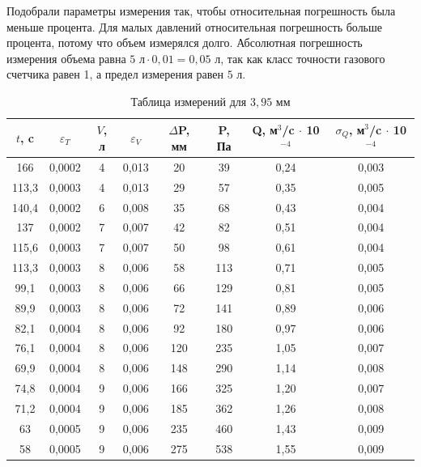 \documentclass[a4paper, 12pt]{article}
\begin{document}
Подобрали параметры измерения так, чтобы относительная погрешность была меньше процента. Для малых давлений относительная погрешность больше процента, потому что объем измерялся долго.
Абсолютная погрешность измерения объема равна $5 \text{ л} \cdot 0,01 = 0,05 \text{ л}$, так как класс точности газового счетчика равен 1, а предел измерения равен $5$ л.

\begin{table}[!ht]
    \centering
    \begin{tabular}{|c|c|c|c|c|c|c|c|}
    \hline
        $t$, c & $\varepsilon_T$ & $V$, л & $\varepsilon_V$ & $\Delta$P, мм & P, Па & Q, м$^3$/c $\cdot$ 10$^{-4}$ & $\sigma_Q$, м$^3$/c $\cdot$ 10$^{-4}$ \\ \hline
        166 & 0,0002 & 4 & 0,013 & 20 & 39 & 0,24 & 0,003 \\ \hline
        113,3 & 0,0003 & 4 & 0,013 & 29 & 57 & 0,35 & 0,005 \\ \hline
        140,4 & 0,0002 & 6 & 0,008 & 35 & 68 & 0,43 & 0,004 \\ \hline
        137 & 0,0002 & 7 & 0,007 & 42 & 82 & 0,51 & 0,004 \\ \hline
        115,6 & 0,0003 & 7 & 0,007 & 50 & 98 & 0,61 & 0,004 \\ \hline
        113,3 & 0,0003 & 8 & 0,006 & 58 & 113 & 0,71 & 0,005 \\ \hline
        99,1 & 0,0003 & 8 & 0,006 & 66 & 129 & 0,81 & 0,005 \\ \hline
        89,9 & 0,0003 & 8 & 0,006 & 72 & 141 & 0,89 & 0,006 \\ \hline
        82,1 & 0,0004 & 8 & 0,006 & 92 & 180 & 0,97 & 0,006 \\ \hline
        76,1 & 0,0004 & 8 & 0,006 & 120 & 235 & 1,05 & 0,007 \\ \hline
        69,9 & 0,0004 & 8 & 0,006 & 148 & 290 & 1,14 & 0,008 \\ \hline
        74,8 & 0,0004 & 9 & 0,006 & 166 & 325 & 1,20 & 0,007 \\ \hline
        71,2 & 0,0004 & 9 & 0,006 & 185 & 362 & 1,26 & 0,008 \\ \hline
        63 & 0,0005 & 9 & 0,006 & 235 & 460 & 1,43 & 0,009 \\ \hline
        58 & 0,0005 & 9 & 0,006 & 275 & 538 & 1,55 & 0,009 \\ \hline
    \end{tabular}
    \caption{Таблица измерений для $3,95$ мм }
\end{table}
\end{document}
